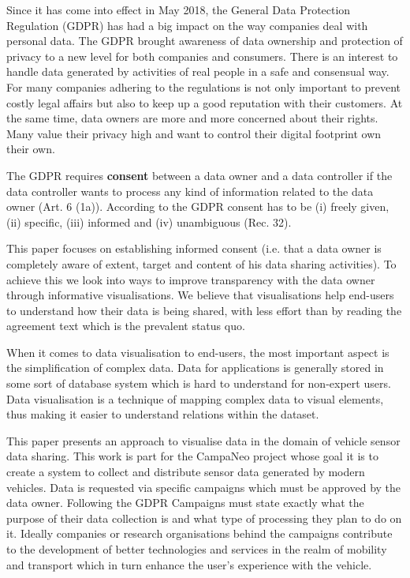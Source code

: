 
  Since it has come into effect in May 2018, the General Data Protection Regulation (GDPR) has had a big impact on the way companies deal with personal data.
  The GDPR brought awareness of data ownership and protection of privacy to a new level for both companies and consumers.
  There is an interest to handle data generated by activities of real people in a safe and consensual way. For many companies adhering to the regulations is not only important to prevent costly legal affairs but also to keep up a good reputation with their customers.
  At the same time, data owners are more and more concerned about their rights. Many value their privacy high and want to control their digital footprint own their own.
  
  The GDPR requires \textbf{consent} between a data owner and a data controller if the data controller wants to process any kind of information related to the data owner (Art. 6 (1a)). According to the GDPR consent has to be (i) freely given, (ii) specific, (iii) informed and (iv) unambiguous (Rec. 32).
  
  This paper focuses on establishing informed consent (i.e. that a data owner is completely aware of extent, target and content of his data sharing activities).
  To achieve this we look into ways to improve transparency with the data owner through informative visualisations. We believe that visualisations help end-users to understand how their data is being shared, with less effort than by reading the agreement text which is the prevalent status quo.
  
  When it comes to data visualisation to end-users, the most important aspect is the simplification of complex data.%
  Data for applications is generally stored in some sort of database system which is hard to understand for non-expert users. Data visualisation is a technique of mapping complex data to visual elements, thus making it easier to understand relations within the dataset.

  This paper presents an approach to visualise data in the domain of vehicle sensor data sharing. This work is part for the CampaNeo project whose goal it is to create a system to collect and distribute sensor data generated by modern vehicles.
  Data is requested via specific campaigns which must be approved by the data owner.
  Following the GDPR Campaigns must state exactly what the purpose of their data collection is and what type of processing they plan to do on it.
  Ideally companies or research organisations behind the campaigns contribute to the development of better technologies and services in the realm of mobility and transport which in turn enhance the user's experience with the vehicle.
  
